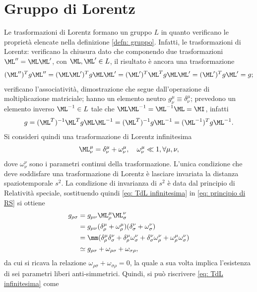 \section{Gruppo di Lorentz}
Le trasformazioni di Lorentz formano un gruppo $L$ in quanto verificano le proprietà elencate nella definizione \ref{defn: gruppo}. Infatti, le trasformazioni di Lorentz: verificano la chiusura dato che componendo due trasformazioni $\ML'' = \ML\ML'$, con $\ML,\ML'\in L$, il risultato è ancora una trasformazione 
\begin{equation}
    (\ML'')^Tg\ML'' = (\ML\ML')^Tg\ML\ML' = (\ML')^T\ML^Tg\ML\ML' = (\ML')^T g \ML' = g;
\end{equation}
verificano l'associatività, dimostrazione che segue dall'operazione di moltiplicazione matriciale; hanno un elemento neutro $g^\mu_\nu\equiv\delta^\mu_\nu$; prevedono un elemento inverso $\ML^{-1}\in L$ tale che $\ML\ML^{-1} = \ML^{-1}\ML = \MI$, infatti
\begin{equation}
    g = (\ML^T)^{-1}\ML^T g \ML\ML^{-1} =  (\ML^T)^{-1}g\ML^{-1} = (\ML^{-1})^T g\ML^{-1}.
\end{equation}
Si consideri quindi una trasformazione di Lorentz infinitesima
\begin{equation}
\label{eq: TdL infinitesima}
    \ML^\mu_\nu = \delta^\mu_\nu + \omega^\mu_\nu,\quad\omega^\mu_\nu\ll 1,\forall\mu,\nu,
\end{equation}
dove $\omega^\nu_\nu$ sono i parametri continui della trasformazione. L'unica condizione che deve soddisfare una trasformazione di Lorentz è lasciare invariata la distanza spaziotemporale $s^2$. La condizione di invarianza di $s^2$ è data dal principio di Relatività speciale, sostituendo quindi \eqref{eq: TdL infinitesima} in \eqref{eq: principio di RS} si ottiene
\begin{equation}
    \begin{split}
        g_{\rho\sigma} &= g_{\mu\nu}\ML^\mu_\rho\ML^\nu_\sigma  \\
        &= g_{\mu\nu}(\delta^\mu_\rho + \omega^\mu_\rho)(\delta^\nu_\sigma + \omega^\nu_\sigma) \\
        &= \mm(\delta^\mu_\rho\delta^\nu_\sigma + \delta^\mu_\rho\omega^\nu_\sigma + \delta^\nu_\sigma\omega^\nu_\rho + \omega^\mu_\rho\omega^\nu_\sigma)\\
        &\simeq g_{\rho\sigma} + \omega_{\rho\sigma} + \omega_{\sigma\rho},
    \end{split}
\end{equation}
da cui si ricava la relazione $\omega_{\rho\sigma} + \omega_{\sigma\rho} = 0$, la quale a sua volta implica l'esistenza di sei parametri liberi anti-simmetrici. Quindi, si può riscrivere \eqref{eq: TdL infinitesima} come
